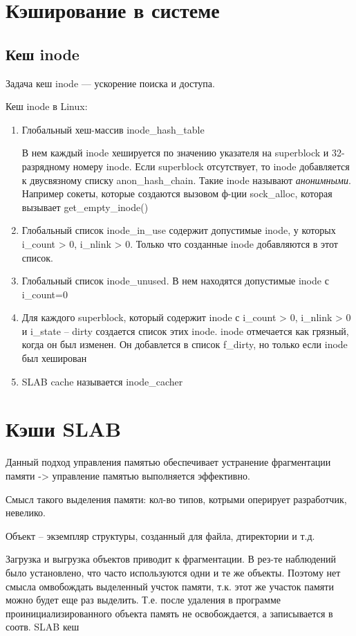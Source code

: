 \section{Кэширование в системе}
\subsection{Кеш inode}
Задача кеш inode --- ускорение поиска и доступа.

Кеш inode в Linux:
\begin{enumerate}
	\item Глобальный хеш-массив inode\_hash\_table
	
	В нем каждый inode хешируется по значению указателя на superblock и 32-разрядному номеру inode. Если superblock отсутствует, то inode добавляется к двусвязному списку anon\_hash\_chain. Такие inode называют \textit{анонимными}. Например сокеты, которые создаются вызовом ф-ции sock\_alloc, которая вызывает get\_empty\_inode()
	
	\item Глобальный список inode\_in\_use содержит допустимые inode, у которых i\_count > 0, i\_nlink > 0.
	Только что созданные inode добавляются в этот список.
	
	\item Глобальный список inode\_unused. В нем находятся допустимые inode с i\_count=0
	
	\item Для каждого superblock, который содержит inode с i\_count > 0, i\_nlink > 0 и i\_state -- dirty создается список этих inode. inode отмечается как грязный, когда он был изменен. Он добавлется в список f\_dirty, но только если inode был хеширован
	
	\item SLAB cache называется inode\_cacher
	
\end{enumerate}


\section{Кэши SLAB}
Данный подход управления памятью обеспечивает устранение фрагментации памяти -> управление памятью выполняется эффективно.

Смысл такого выделения памяти:
кол-во типов, котрыми оперирует разработчик, невелико. 

Объект -- экземпляр структуры, созданный для файла, дтиректории и т.д.

 Загрузка и выгрузка объектов приводит к фрагментации. В рез-те наблюдений было установлено, что часто используются одни и те же объекты. Поэтому нет смысла омвобождать выделенный учсток памяти, т.к. этот же участок памяти можно будет еще раз выделить. Т.е. после удаления в программе проинициализированного объекта память не освобождается, а записывается в соотв. SLAB кеш 

